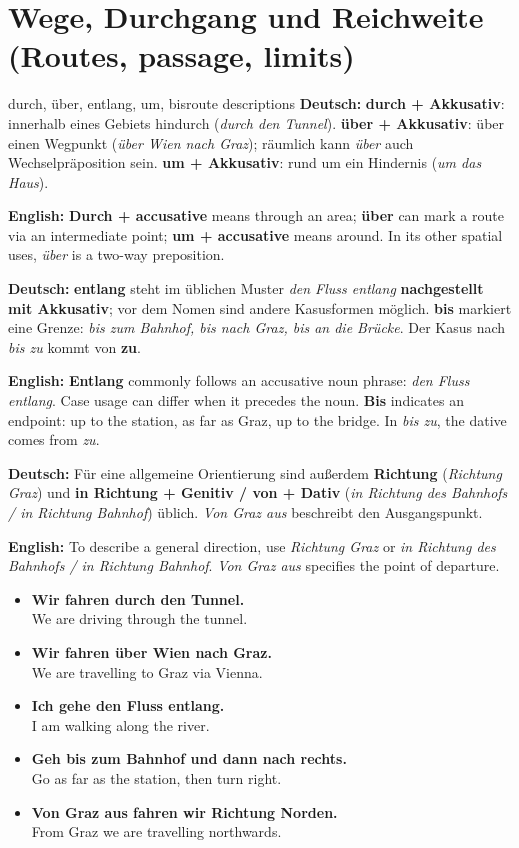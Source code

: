 \documentclass[a4paper,11pt]{article}
\newcommand{\GermanText}[1]{\textbf{Deutsch: }#1\par}
\newcommand{\EnglishText}[1]{{\small\color{SoftGray}\textbf{English: }#1\par}}
\newcommand{\ExampleItem}[2]{\item \textbf{#1}\\{\small\color{SoftGray}#2}}
\begin{document}
\section{Wege, Durchgang und Reichweite (Routes, passage, limits)}
\begin{grammarentry}{durch, über, entlang, um, bis}{route descriptions}
\GermanText{\textbf{durch + Akkusativ}: innerhalb eines Gebiets hindurch (\emph{durch den Tunnel}). \textbf{über + Akkusativ}: über einen Wegpunkt (\emph{über Wien nach Graz}); räumlich kann \emph{über} auch Wechselpräposition sein. \textbf{um + Akkusativ}: rund um ein Hindernis (\emph{um das Haus}).}
\EnglishText{\textbf{Durch + accusative} means through an area; \textbf{über} can mark a route via an intermediate point; \textbf{um + accusative} means around. In its other spatial uses, \emph{über} is a two-way preposition.}
\GermanText{\textbf{entlang} steht im üblichen Muster \emph{den Fluss entlang} \textbf{nachgestellt mit Akkusativ}; vor dem Nomen sind andere Kasusformen möglich. \textbf{bis} markiert eine Grenze: \emph{bis zum Bahnhof, bis nach Graz, bis an die Brücke}. Der Kasus nach \emph{bis zu} kommt von \textbf{zu}.}
\EnglishText{\textbf{Entlang} commonly follows an accusative noun phrase: \emph{den Fluss entlang}. Case usage can differ when it precedes the noun. \textbf{Bis} indicates an endpoint: up to the station, as far as Graz, up to the bridge. In \emph{bis zu}, the dative comes from \emph{zu}.}
\GermanText{Für eine allgemeine Orientierung sind außerdem \textbf{Richtung} (\emph{Richtung Graz}) und \textbf{in Richtung + Genitiv / von + Dativ} (\emph{in Richtung des Bahnhofs / in Richtung Bahnhof}) üblich. \emph{Von Graz aus} beschreibt den Ausgangspunkt.}
\EnglishText{To describe a general direction, use \emph{Richtung Graz} or \emph{in Richtung des Bahnhofs / in Richtung Bahnhof}. \emph{Von Graz aus} specifies the point of departure.}
\end{grammarentry}
\begin{exbox}\begin{itemize}
\ExampleItem{Wir fahren durch den Tunnel.}{We are driving through the tunnel.}
\ExampleItem{Wir fahren über Wien nach Graz.}{We are travelling to Graz via Vienna.}
\ExampleItem{Ich gehe den Fluss entlang.}{I am walking along the river.}
\ExampleItem{Geh bis zum Bahnhof und dann nach rechts.}{Go as far as the station, then turn right.}
\ExampleItem{Von Graz aus fahren wir Richtung Norden.}{From Graz we are travelling northwards.}
\end{itemize}\end{exbox}
\end{document}
